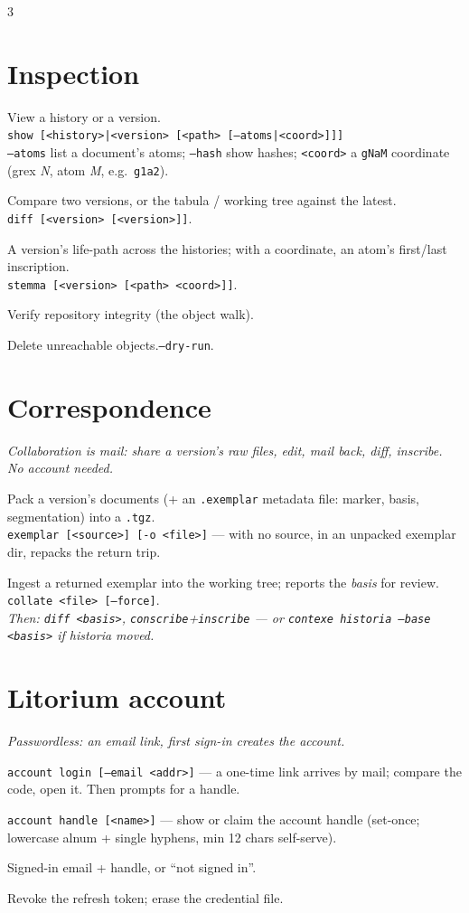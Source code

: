 \documentclass[9pt]{extarticle}
\newcommand{\ci}[1]{\texttt{#1}}                       %
\newcommand{\opt}[1]{\textcolor{faint}{\texttt{#1}}}   %
\newcommand{\entry}[2]{\needspace{2\baselineskip}\item[\ci{\textbf{#1}}]#2}
\begin{document}
\begin{multicols}{3}
\section{Inspection}
\begin{description}
\entry{show}{View a history or a version.\\
\ci{show [<history>|<version> [<path> [--atoms|<coord>]]]}\\
\opt{--atoms}\; list a document's atoms;\;
\opt{--hash}\; show hashes;\;
\opt{<coord>}\; a \ci{gNaM} coordinate (grex \emph{N}, atom
\emph{M}, e.g.\ \ci{g1a2}).}
\entry{diff}{Compare two versions, or the tabula / working tree
against the latest.\\
\ci{diff [<version> [<version>]]}.}
\entry{stemma}{A version's life-path across the histories; with
a coordinate, an atom's first/last inscription.\\
\ci{stemma [<version> [<path> <coord>]]}.}
\entry{fsck}{Verify repository integrity (the object walk).}
\entry{gc}{Delete unreachable objects.\quad\opt{--dry-run}.}
\end{description}

\section{Correspondence}
\emph{Collaboration is mail: share a version's raw files, edit,
mail back, diff, inscribe. No account needed.}
\begin{description}
\entry{exemplar}{Pack a version's documents (+ an \ci{.exemplar}
metadata file: marker, basis, segmentation) into a
\ci{.tgz}.\\
\ci{exemplar [<source>] [-o <file>]}\; — with no source, in an
unpacked exemplar dir, repacks the return trip.}
\entry{collate}{Ingest a returned exemplar into the working
tree; reports the \emph{basis} for review.\quad
\ci{collate <file> [--force]}.\\
\emph{Then: \ci{diff <basis>}, \ci{conscribe}+\ci{inscribe} —
or \ci{contexe historia --base <basis>} if historia moved.}}
\end{description}

\section{Litorium account}
\emph{Passwordless: an email link, first sign-in creates the
account.}
\begin{description}
\entry{account login}{\ci{account login [--email <addr>]} — a
one-time link arrives by mail; compare the code, open it. Then
prompts for a handle.}
\entry{account handle}{\ci{account handle [<name>]} — show or
claim the account handle (set-once; lowercase alnum + single
hyphens, min 12 chars self-serve).}
\entry{account status}{Signed-in email + handle, or ``not
signed in''.}
\entry{account logout}{Revoke the refresh token; erase the
credential file.}
\end{description}


\end{multicols}
\end{document}
